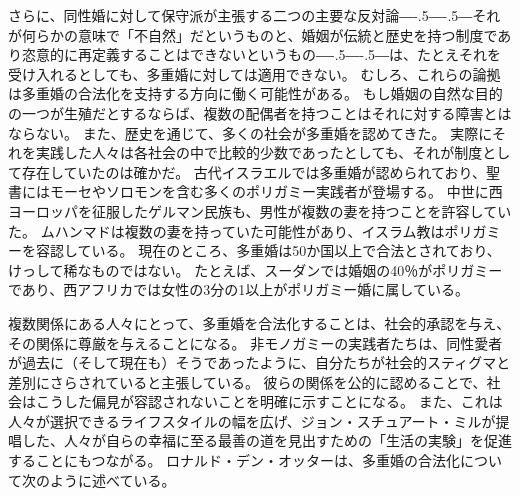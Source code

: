 \documentclass[paper=a4,book,openany]{jlreq}
\def\DDASH{―\kern-.5\zw―\kern-.5\zw―} %
\begin{document}
さらに、同性婚に対して保守派が主張する二つの主要な反対論{\DDASH}それが何らかの意味で「不自然」だというものと、婚姻が伝統と歴史を持つ制度であり恣意的に再定義することはできないというもの{\DDASH}は、たとえそれを受け入れるとしても、多重婚に対しては適用できない。
むしろ、これらの論拠は多重婚の合法化を支持する方向に働く可能性がある。
もし婚姻の自然な目的の一つが生殖だとするならば、複数の配偶者を持つことはそれに対する障害とはならない。
また、歴史を通じて、多くの社会が多重婚を認めてきた。
実際にそれを実践した人々は各社会の中で比較的少数であったとしても、それが制度として存在していたのは確かだ。
古代イスラエルでは多重婚が認められており、聖書にはモーセやソロモンを含む多くのポリガミー実践者が登場する。
中世に西ヨーロッパを征服したゲルマン民族も、男性が複数の妻を持つことを許容していた。
ムハンマドは複数の妻を持っていた可能性があり、イスラム教はポリガミーを容認している。
現在のところ、多重婚は50か国以上で合法とされており、けっして稀なものではない。
たとえば、スーダンでは婚姻の40％がポリガミーであり、西アフリカでは女性の3分の1以上がポリガミー婚に属している\citep{economist17:_link_between_polyg_war,dalton14:_why_is_polyg_more_preval_wester_afric}。

複数関係にある人々にとって、多重婚を合法化することは、社会的承認を与え、その関係に尊厳を与えることになる。
非モノガミーの実践者たちは、同性愛者が過去に（そして現在も）そうであったように、自分たちが社会的スティグマと差別にさらされていると主張している。
彼らの関係を公的に認めることで、社会はこうした偏見が容認されないことを明確に示すことになる。
また、これは人々が選択できるライフスタイルの幅を広げ、ジョン・スチュアート・ミルが提唱した、人々が自らの幸福に至る最善の道を見出すための「生活の実験」を促進することにもつながる\citep[p.57]{mill89:_liber_other_writin}。
ロナルド・デン・オッターは、多重婚の合法化について次のように述べている。
\end{document}

